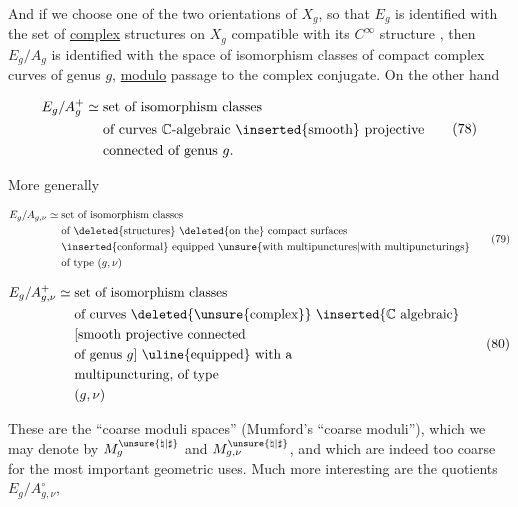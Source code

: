 And if we choose one of the two orientations of \(X_g\), so that \(E_g\) is identified with the set of \uline{complex} structures on \(X_g\) compatible with its \(C^\infty\) structure , then \(E_g/A_g\) is identified with the space of isomorphism classes of compact complex curves  of genus \(g\), \uline{modulo} passage to the complex conjugate. On the other hand


\[
 \begin{aligned}
 E_g/A_g^+\simeq{}&\text{set of isomorphism classes}\\
 &\text{of curves }\mathbb C\text{-algebraic \inserted{smooth} projective}\\
 &\text{connected of genus }g.
 \end{aligned}
 \tag{78}
\]

More generally

\[
 \begin{aligned}
 E_g/A_{g,\nu}\simeq{}&\text{set of isomorphism classes}\\
 &\text{of \deleted{structures} \deleted{on the} compact surfaces}\\
 &\text{\inserted{conformal} equipped \unsure{with multipunctures|with multipuncturings}}\\
 &\text{of type }(g,\nu)
 \end{aligned}
 \tag{79}
\]

\[
 \begin{aligned}
 E_g/A_{g,\nu}^{+}\simeq{}&\text{set of isomorphism classes}\\
 &\text{of curves \deleted{\unsure{complex}} \inserted{\(\mathbb C\) algebraic}}\\
 &\text{[smooth projective connected}\\
 &\text{of genus }g\text{] \uline{equipped} with a}\\
 &\text{multipuncturing, of type}\\
 &(g,\nu)
 \end{aligned}
 \tag{80}
\]

These are the ``coarse moduli spaces'' (Mumford's ``coarse moduli''), which we may denote by \(M_g^{\unsure{\natural|\sharp}}\) and \(M_{g,\nu}^{\unsure{\natural|\sharp}}\), and which are indeed too coarse for the most important geometric uses.  Much more interesting are the quotients \(E_g/A_{g,\nu}^{\circ}\), 


